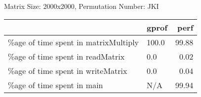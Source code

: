 \documentclass{article}
\begin{document}
    Matrix Size: 2000x2000, Permutation Number: JKI \\
    \begin{tabular}{llr}
\hline
                                      & gprof   &   perf \\
\hline
 \%age of time spent in matrixMultiply & 100.0   &  99.88 \\
 \%age of time spent in readMatrix     & 0.0     &   0.02 \\
 \%age of time spent in writeMatrix    & 0.0     &   0.04 \\
 \%age of time spent in main           & N/A     &  99.94 \\
\hline
\end{tabular}
    
\end{document}
